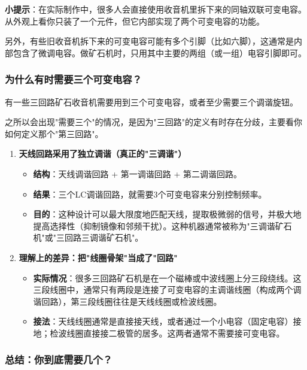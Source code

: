 \documentclass[12pt,UTF8]{ctexbook}
\begin{document}
\textbf{小提示}：在实际制作中，很多人会直接使用收音机里拆下来的同轴双联可变电容。从外观上看你只装了一个元件，但它内部实现了两个可变电容的功能。

另外，有些旧收音机拆下来的可变电容可能有多个引脚（比如六脚），这通常是内部包含了微调电容。做矿石机时，只用其中主要的两组（或一组）电容引脚即可。

\subsubsection{为什么有时需要三个可变电容？}

有一些三回路矿石收音机需要用到三个可变电容，或者至少需要三个调谐旋钮。

之所以会出现"需要三个"的情况，是因为"三回路"的定义有时存在分歧，主要看你如何定义那个"第三回路"。

\begin{enumerate}
	\item \textbf{天线回路采用了独立调谐（真正的"三调谐"）}
	\begin{itemize}[leftmargin=3.5em]
		\item \textbf{结构}：天线调谐回路 + 第一调谐回路 + 第二调谐回路。
		\item \textbf{结果}：三个LC调谐回路，就需要3个可变电容来分别控制频率。
		\item \textbf{目的}：这种设计可以最大限度地匹配天线，提取极微弱的信号，并极大地提高选择性（抑制镜像和邻频干扰）。这种机器通常被称为"三调谐矿石机"或"三回路三调谐矿石机"。
	\end{itemize}
	
	\item \textbf{理解上的差异：把"线圈骨架"当成了"回路"}
	\begin{itemize}[leftmargin=3.5em]
		\item \textbf{实际情况}：很多三回路矿石机是在一个磁棒或中波线圈上分三段绕线。这三段线圈中，通常只有两段是连接了可变电容的主调谐线圈（构成两个调谐回路），第三段线圈往往是天线线圈或检波线圈。
		\item \textbf{接法}：天线线圈通常是直接接天线，或者通过一个小电容（固定电容）接地；检波线圈直接接二极管的居多。这两者通常不需要接可变电容。
	\end{itemize}
\end{enumerate}

\subsubsection{总结：你到底需要几个？}
\end{document}
